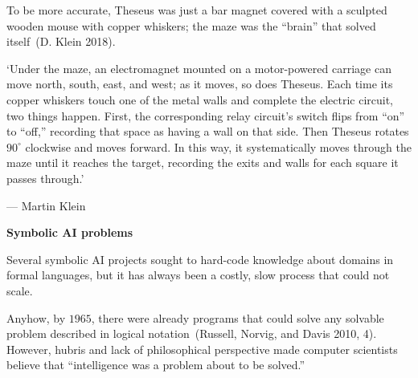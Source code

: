 \documentclass[
  letterpaper,
  12pt,
  british]{tufte-book}
\renewenvironment{quote}{
  \list{}{\leftmargin=3.5cm\topsep=0pt}
  \item\relax\small\itshape
}
{\endlist}
\theoremstyle{plain}
\theoremstyle{plain}
\theoremstyle{definition}
\theoremstyle{remark}
\begin{document}
To be more accurate, Theseus was just a bar magnet covered with a
sculpted wooden mouse with copper whiskers; the maze was the ``brain''
that solved itself~(D. Klein
2018).

\begin{quote}
`Under the maze, an electromagnet mounted on a motor-­powered carriage
can move north, south, east, and west; as it moves, so does Theseus.
Each time its copper whiskers touch one of the metal walls and complete
the electric circuit, two things happen. First, the corresponding relay
circuit's switch flips from ``on'' to ``off,'' recording that space as
having a wall on that side. Then Theseus rotates \(90^{\circ}\)
clockwise and moves forward. In this way, it systematically moves
through the maze until it reaches the target, recording the exits and
walls for each square it passes through.'

--- Martin Klein
\end{quote}

\textbf{Symbolic AI problems}

Several symbolic AI projects sought to hard-code knowledge about domains
in formal languages, but it has always been a costly, slow process that
could not scale.

Anyhow, by \(1965\), there were already programs that could solve any
solvable problem described in logical notation~(Russell, Norvig, and
Davis 2010,
4).
However, hubris and lack of philosophical perspective made computer
scientists believe that ``intelligence was a problem about to be
solved.''
\end{document}
